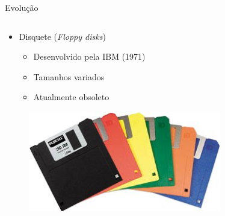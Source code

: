 \documentclass[aspectratio=169,
				xcolor=table]{beamer}
\begin{document}
	\begin{frame}{Evolução}
		\begin{columns}
			\begin{column}{0.5\textwidth}
				\begin{itemize}
					\item Disquete (\textit{Floppy disks})
					\begin{itemize}
						\item Desenvolvido pela IBM (1971)
						\item Tamanhos variados
						\item Atualmente obsoleto
					\end{itemize}
				\end{itemize}
				\vspace{1em}
				
				\begin{figure}
					\centering				
					\includegraphics[width=0.75\textwidth, keepaspectratio]{../figs/cap08/disquete}
				\end{figure}
				

\end{column}
\end{columns}
\end{frame}
\end{document}

